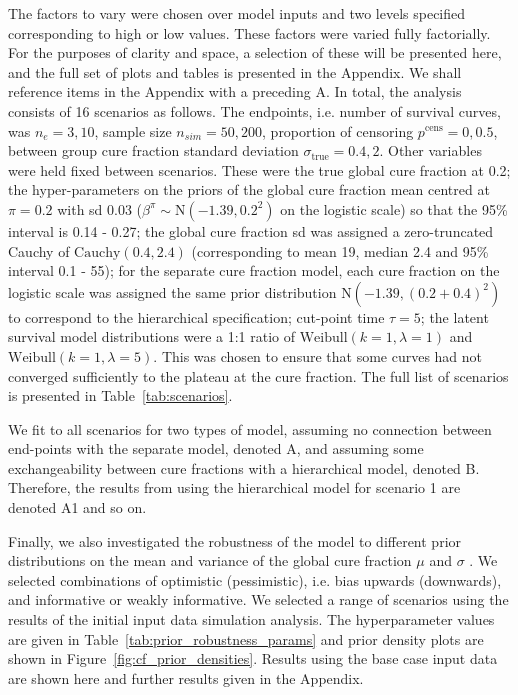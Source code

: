 \documentclass[AMA,STIX1COL]{WileyNJD-v2}
\begin{document}
The factors to vary were chosen over model inputs and two levels specified corresponding to high or low values. These factors were varied fully factorially. For the purposes of clarity and space, a selection of these will be presented here, and the full set of plots and tables is presented in the Appendix. We shall reference items in the Appendix with a preceding A.
In total, the analysis consists of 16 scenarios as follows.
The endpoints, i.e. number of survival curves, was $n_e = {3,10}$, sample size $n_{sim} = {50,200}$, proportion of censoring $p^{\text{cens}} = {0,0.5}$, between group cure fraction standard deviation $\sigma_{\text{true}} = {0.4,2}$.
Other variables were held fixed between scenarios. These were the true global cure fraction at 0.2; the hyper-parameters on the priors of the global cure fraction mean centred at $\pi = 0.2$ with sd 0.03 ($\beta^{\pi} \sim \text{N}(-1.39, 0.2^2)$ on the logistic scale) so that the 95\% interval is 0.14 - 0.27;
the global cure fraction sd was assigned a zero-truncated Cauchy of $\text{Cauchy}(0.4, 2.4)$ (corresponding to mean 19, median 2.4 and 95\% interval 0.1 - 55);
for the separate cure fraction model, each cure fraction on the logistic scale was assigned the same prior distribution $\text{N}(-1.39, (0.2 + 0.4)^2)$ to correspond to the hierarchical specification;
cut-point time $\tau = {5}$; the latent survival model distributions were a 1:1 ratio of $\text{Weibull}(k=1, \lambda=1)$ and $\text{Weibull}(k=1, \lambda=5)$. This was chosen to ensure that some curves had not converged sufficiently to the plateau at the cure fraction. The full list of scenarios is presented in Table~\ref{tab:scenarios}.

We fit to all scenarios for two types of model, assuming no connection between end-points with the separate model, denoted A, and assuming some exchangeability between cure fractions with a hierarchical model, denoted B. Therefore, the results from using the hierarchical model for scenario 1 are denoted A1 and so on.

Finally, we also investigated the robustness of the model to different prior distributions on the mean and variance of the global cure fraction $\mu$ and $\sigma$ \cite{Ott2021}. We selected combinations of optimistic (pessimistic), i.e. bias upwards (downwards), and informative or weakly informative. We selected a range of scenarios using the results of the initial input data simulation analysis. The hyperparameter values are given in Table~\ref{tab:prior_robustness_params} and prior density plots are shown in Figure~\ref{fig:cf_prior_densities}. Results using the base case input data are shown here and further results given in the Appendix.
\end{document}
